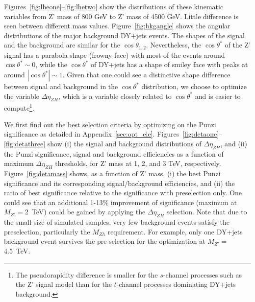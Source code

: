 Figures~\ref{fig:lheone}--\ref{fig:lhetwo} show the distributions of these 
kinematic variables from Z' mass of 800 GeV to Z' mass of 4500 GeV. Little 
difference is seen between different mass values. 
Figure~\ref{fig:bkgangle} shows the angular distributions 
of the major background DY+jets events. 
The shapes of the signal and the background are similar for the 
$\cos{\theta_{1,2}}$. Nevertheless, the $\cos{\theta^*}$ of the Z' 
signal has a parabola shape (frowny face) with most of the 
events around $\cos{\theta^*}\sim 0$, while the $\cos{\theta^*}$ of 
DY+jets has a shape of smiley face with peaks at 
around $\left|\cos{\theta^*}\right|\sim 1$. 
Given that one could see a distinctive shape difference between signal and 
background in the $\cos{\theta^*}$ distribution, we choose to optimize 
the variable $\Delta \eta_{ZH}$, which is a variable closely related to 
$\cos{\theta^*}$ and is easier to compute\footnote{The pseudorapidity difference 
is smaller for the $s$-channel processes such as the Z' signal model than for 
the $t$-channel processes dominating DY+jets background.}. 

We first find out the best selection criteria by optimizing on the Punzi 
significance as detailed in Appendix~\ref{sec:opt_ele}. 
Figures~\ref{fig:detaone}--\ref{fig:detathree} show (i) the signal and background 
distributions of $\Delta \eta_{ZH}$, and (ii) the Punzi significance, signal and 
background efficiencies as a function of maximum $\Delta \eta_{ZH}$ thresholds, 
for Z' mass at 1, 2, and 3 TeV, respectively. 
Figure~\ref{fig:detamass} shows, as a function of Z' mass, 
(i) the best Punzi significance and its corresponding 
signal/background efficiencies, and (ii) the ratio of best significance relative 
to the significance with preselection only. One 
could see that an additional 1-13\% improvement of significance 
(maximum at $M_{Z'}=$2~TeV) could be gained by applying the 
$\Delta \eta_{ZH}$ selection.
Note that due to the small size of simulated samples, very few background 
events satisfy the preselection, particularly the $M_{Zh}$ requirement. 
For example, only one DY+jets 
background event survives the pre-selection for the optimization at 
$M_{Z'}=$4.5~TeV. 

